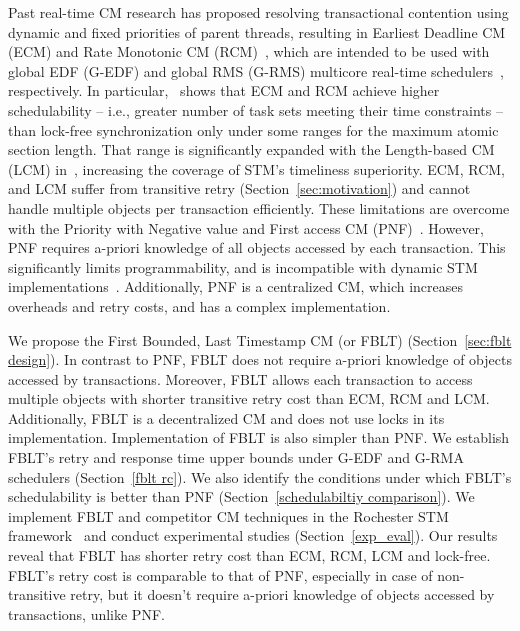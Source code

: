 \documentclass[conference,letterpaper]{IEEEtran}
\begin{document}
Past real-time CM research 
has proposed resolving transactional contention using dynamic and fixed priorities of parent threads, resulting in Earliest Deadline CM (ECM) and Rate Monotonic CM (RCM)~\cite{6045438,stmconcurrencycontrol:emsoft11,lcmdac2012}, which are intended to be used with global EDF (G-EDF) and global RMS (G-RMS) multicore real-time schedulers~\cite{Davis:2011:SHR:1978802.1978814}, respectively.
In particular,~\cite{stmconcurrencycontrol:emsoft11} shows that ECM and RCM achieve higher schedulability -- i.e., greater number of task sets meeting their time constraints -- than lock-free synchronization only under some ranges for the maximum atomic section length. That range is significantly expanded with the Length-based CM (LCM) in~\cite{lcmdac2012}, increasing the coverage of STM's timeliness superiority. ECM, RCM, and LCM suffer from transitive retry (Section~\ref{sec:motivation}) and cannot handle multiple objects per transaction efficiently. These limitations are overcome with the Priority with Negative value and First access CM (PNF)~\cite{pnf_dac_asp,shambake_phd_proposal}. However, PNF requires a-priori knowledge of all objects accessed by each transaction. This significantly limits programmability, and is incompatible with dynamic STM implementations~\cite{Herlihy:2003:STM:872035.872048}. Additionally, PNF is a centralized CM, which increases overheads and retry costs, and has a complex implementation. 

We propose the First Bounded, Last Timestamp CM (or FBLT) (Section~\ref{sec:fblt design}). In contrast to PNF, FBLT does not require a-priori knowledge of objects accessed by transactions. Moreover, FBLT allows each transaction to access multiple objects with shorter transitive retry cost than ECM, RCM and LCM. Additionally, FBLT is a decentralized CM and does not use locks in its implementation. Implementation of FBLT is also simpler than PNF. We establish FBLT's retry and response time upper bounds under G-EDF and G-RMA schedulers (Section~\ref{fblt rc}). We also identify the conditions under which FBLT's schedulability is better than PNF (Section~\ref{schedulabiltiy comparison}). We implement FBLT and competitor CM techniques in the Rochester STM framework~\cite{marathe2006lowering} and conduct experimental studies (Section~\ref{exp_eval}). Our results reveal that FBLT has shorter retry cost than ECM, RCM, LCM and lock-free. FBLT's retry cost is comparable to that of PNF, especially in case of non-transitive retry, but it doesn't require a-priori knowledge of objects accessed by transactions, unlike PNF. 
\end{document}
